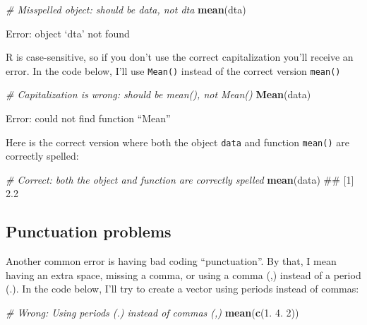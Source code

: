 \documentclass[]{book}
\newenvironment{Shaded}{\begin{snugshade}}{\end{snugshade}}
\newcommand{\KeywordTok}[1]{\textcolor[rgb]{0.13,0.29,0.53}{\textbf{#1}}}
\newcommand{\DecValTok}[1]{\textcolor[rgb]{0.00,0.00,0.81}{#1}}
\newcommand{\CommentTok}[1]{\textcolor[rgb]{0.56,0.35,0.01}{\textit{#1}}}
\newcommand{\NormalTok}[1]{#1}
\theoremstyle{definition}
\theoremstyle{definition}
\theoremstyle{remark}
\begin{document}
\begin{Shaded}
\begin{Highlighting}[]
\CommentTok{# Misspelled object: should be data, not dta}
\KeywordTok{mean}\NormalTok{(dta)}
\end{Highlighting}
\end{Shaded}

Error: object `dta' not found

R is case-sensitive, so if you don't use the correct capitalization
you'll receive an error. In the code below, I'll use \texttt{Mean()}
instead of the correct version \texttt{mean()}

\begin{Shaded}
\begin{Highlighting}[]
\CommentTok{# Capitalization is wrong: should be mean(), not Mean()}
\KeywordTok{Mean}\NormalTok{(data)}
\end{Highlighting}
\end{Shaded}

Error: could not find function ``Mean''

Here is the correct version where both the object \texttt{data} and
function \texttt{mean()} are correctly spelled:

\begin{Shaded}
\begin{Highlighting}[]
\CommentTok{# Correct: both the object and function are correctly spelled}
\KeywordTok{mean}\NormalTok{(data)}
\NormalTok{## [1] 2.2}
\end{Highlighting}
\end{Shaded}

\subsection{Punctuation problems}\label{punctuation-problems}

Another common error is having bad coding ``punctuation''. By that, I
mean having an extra space, missing a comma, or using a comma (,)
instead of a period (.). In the code below, I'll try to create a vector
using periods instead of commas:

\begin{Shaded}
\begin{Highlighting}[]
\CommentTok{# Wrong: Using periods (.) instead of commas (,)}
\KeywordTok{mean}\NormalTok{(}\KeywordTok{c}\NormalTok{(}\DecValTok{1}\NormalTok{. }\DecValTok{4}\NormalTok{. }\DecValTok{2}\NormalTok{))}
\end{Highlighting}
\end{Shaded}
\end{document}
